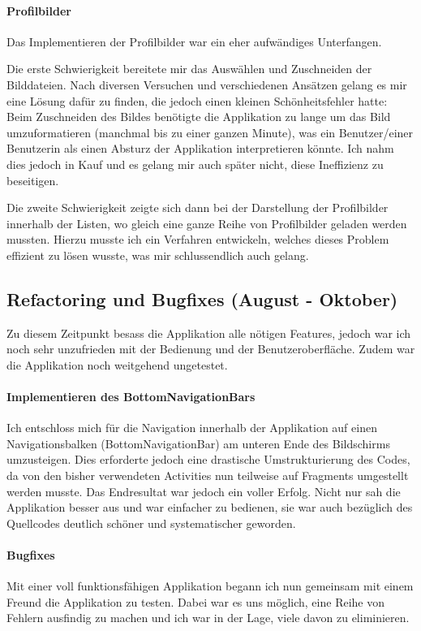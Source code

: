 \documentclass[../main.tex]{subfiles}
\begin{document}
	\paragraph{Profilbilder}
	Das Implementieren der Profilbilder war ein eher aufwändiges Unterfangen.
	
	Die erste Schwierigkeit bereitete mir das Auswählen und Zuschneiden der Bilddateien. Nach diversen Versuchen und verschiedenen Ansätzen gelang es mir eine Lösung dafür zu finden, die jedoch einen kleinen Schönheitsfehler hatte: Beim Zuschneiden des Bildes benötigte die Applikation zu lange um das Bild umzuformatieren (manchmal bis zu einer ganzen Minute), was ein Benutzer/einer Benutzerin als einen Absturz der Applikation interpretieren könnte. Ich nahm dies jedoch in Kauf und es gelang mir auch später nicht, diese Ineffizienz zu beseitigen.
	
	Die zweite Schwierigkeit zeigte sich dann bei der Darstellung der Profilbilder innerhalb der Listen, wo gleich eine ganze Reihe von Profilbilder geladen werden mussten. Hierzu musste ich ein Verfahren entwickeln, welches dieses Problem effizient zu lösen wusste, was mir schlussendlich auch gelang.
	
	\subsection{Refactoring und Bugfixes (August - Oktober)}
	Zu diesem Zeitpunkt besass die Applikation alle nötigen Features, jedoch war ich noch sehr unzufrieden mit der Bedienung und der Benutzeroberfläche. Zudem war die Applikation noch weitgehend ungetestet.
	\paragraph{Implementieren des BottomNavigationBars}
	Ich entschloss mich für die Navigation innerhalb der Applikation auf einen Navigationsbalken (BottomNavigationBar) am unteren Ende des Bildschirms umzusteigen. Dies erforderte jedoch eine drastische Umstrukturierung des Codes, da von den bisher verwendeten Activities nun teilweise auf Fragments umgestellt werden musste. Das Endresultat war jedoch ein voller Erfolg. Nicht nur sah die Applikation besser aus und war einfacher zu bedienen, sie war auch bezüglich des Quellcodes deutlich schöner und systematischer geworden.
	\paragraph{Bugfixes}
	Mit einer voll funktionsfähigen Applikation begann ich nun gemeinsam mit einem Freund die Applikation zu testen. Dabei war es uns möglich, eine Reihe von Fehlern ausfindig zu machen und ich war in der Lage, viele davon zu eliminieren.
\end{document}
